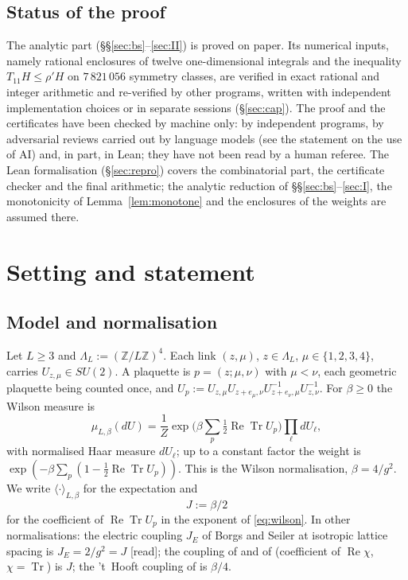 \documentclass[11pt,a4paper]{article}
\theoremstyle{plain}
\theoremstyle{remark}
\numberwithin{equation}{section}
\newcommand{\Z}{\mathbb{Z}}
\newcommand{\Tr}{\operatorname{Tr}}
\newcommand{\ReTr}{\operatorname{Re}\operatorname{Tr}}
\newcommand{\st}[1]{\textsf{[#1]}}
\begin{document}
\subsection{Status of the proof}\label{sec:status}
The analytic part (\S\S\ref{sec:bs}--\ref{sec:II}) is proved on paper. Its numerical inputs, namely rational enclosures of twelve
one-dimensional integrals and the inequality $T_{11}H\le\rho'H$ on $7\,821\,056$ symmetry classes, are verified in exact rational and
integer arithmetic and re-verified by other programs, written with independent implementation choices or in separate sessions
(\S\ref{sec:cap}). The proof and the certificates have been
checked by machine only: by independent programs, by adversarial reviews carried out by language models (see the statement on the
use of AI) and, in part, in Lean; they have not been read by a human referee. The Lean formalisation (\S\ref{sec:repro}) covers the
combinatorial part, the certificate checker and the final arithmetic; the analytic reduction of \S\S\ref{sec:bs}--\ref{sec:I}, the
monotonicity of Lemma~\ref{lem:monotone} and the enclosures of the weights are assumed there.

\section{Setting and statement}\label{sec:statement}

\subsection{Model and normalisation}
Let $L\ge3$ and $\Lambda_L:=(\Z/L\Z)^4$. Each link $(z,\mu)$, $z\in\Lambda_L$, $\mu\in\{1,2,3,4\}$, carries $U_{z,\mu}\in SU(2)$.
A plaquette is $p=(z;\mu,\nu)$ with $\mu<\nu$, each geometric plaquette being counted once, and
$U_p:=U_{z,\mu}U_{z+e_\mu,\nu}U_{z+e_\nu,\mu}^{-1}U_{z,\nu}^{-1}$. For $\beta\ge0$ the Wilson measure is
\begin{equation}\label{eq:wilson}
\mu_{L,\beta}(dU)=\frac1Z\exp\Big(\beta\sum_p\tfrac12\ReTr U_p\Big)\prod_\ell dU_\ell ,
\end{equation}
with normalised Haar measure $dU_\ell$; up to a constant factor the weight is $\exp(-\beta\sum_p(1-\frac12\ReTr U_p))$. This is the
Wilson normalisation, $\beta=4/g^2$. We write $\langle\cdot\rangle_{L,\beta}$ for the expectation and
\begin{equation}\label{eq:J}
J:=\beta/2
\end{equation}
for the coefficient of $\ReTr U_p$ in the exponent of \eqref{eq:wilson}. In other normalisations: the electric coupling $J_E$ of
Borgs and Seiler \cite[(II.2)--(II.4), p.~332]{BS83} at isotropic lattice spacing is $J_E=2/g^2=J$ \st{read}; the coupling of
\cite[(1.13)--(1.16)]{DF80} and of \cite{Fro79} (coefficient of $\operatorname{Re}\chi$, $\chi=\Tr$) is $J$; the 't~Hooft coupling of
\cite{CNS25} is $\beta/4$.
\end{document}
